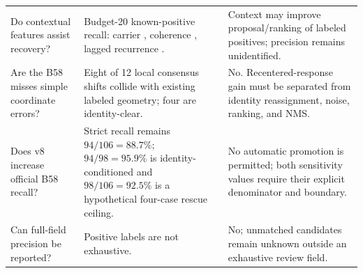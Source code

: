 \begin{longtable}{>{\raggedright\arraybackslash}p{} >{\raggedright\arraybackslash}p{} >{\raggedright\arraybackslash}p{}}
Do contextual features assist recovery? & Budget-20 known-positive recall: carrier \CarrierRecallBtwenty{}, coherence \CoherenceRecallBtwenty{}, lagged recurrence \LagRecallBtwenty{}. & Context may improve proposal/ranking of labeled positives; precision remains unidentified. \\
Are the B58 misses simple coordinate errors? & Eight of 12 local consensus shifts collide with existing labeled geometry; four are identity-clear. & No. Recentered-response gain must be separated from identity reassignment, noise, ranking, and NMS. \\
Does v8 increase official B58 recall? & Strict recall remains $94/106=88.7\%$; $94/98=95.9\%$ is identity-conditioned and $98/106=92.5\%$ is a hypothetical four-case rescue ceiling. & No automatic promotion is permitted; both sensitivity values require their explicit denominator and boundary. \\
Can full-field precision be reported? & Positive labels are not exhaustive. & No; unmatched candidates remain unknown outside an exhaustive review field. \\
\end{longtable}
\endgroup
